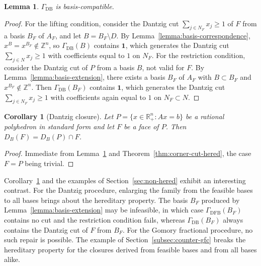 \documentclass{article}
\newtheorem{corollary}{Corollary}
\newtheorem{lemma}{Lemma}
\newcommand{\Z}{\mathbb{Z}}
\newcommand{\R}{\mathbb{R}}
\begin{document}
\begin{lemma} \label{lemma:dantzig-compatible}
    $\Gamma_{\mathrm{DB}}$ is basis-compatible.
\end{lemma}

\begin{proof}
    For the lifting condition, consider the Dantzig cut $\sum_{j \in N_F} x_j \geq 1$ of $F$ from a basis $B_F$ of $A_F$, and let $B = B_F \setminus D$. By Lemma~\ref{lemma:basis-correspondence}, $x^B = x^{B_F} \notin \Z^n$, so $\Gamma_{\mathrm{DB}}(B)$ contains $\mathbf{1}$, which generates the Dantzig cut $\sum_{j \in N} x_j \geq 1$ with coefficients equal to $1$ on $N_F$. For the restriction condition, consider the Dantzig cut of $P$ from a basis $B$, not valid for $F$. By Lemma~\ref{lemma:basis-extension}, there exists a basis $B_F$ of $A_F$ with $B \subset B_F$ and $x^{B_F} \notin \Z^n$. Then $\Gamma_{\mathrm{DB}}(B_F)$ contains $\mathbf{1}$, which generates the Dantzig cut $\sum_{j \in N_F} x_j \geq 1$ with coefficients again equal to $1$ on $N_F \subset N$.
\end{proof}

\begin{corollary}[Dantzig closure] \label{cor:dantzig-hered}
    Let $P = \{x \in \R_+^n : Ax = b\}$ be a rational polyhedron in standard form and let $F$ be a face of $P$. Then $D_{B}(F) = D_{B}(P) \cap F$.
\end{corollary}

\begin{proof}
    Immediate from Lemma~\ref{lemma:dantzig-compatible} and Theorem~\ref{thm:corner-cut-hered}, the case $F = P$ being trivial.
\end{proof}

Corollary~\ref{cor:dantzig-hered} and the examples of Section~\ref{sec:non-hered} exhibit an interesting contrast. For the Dantzig procedure, enlarging the family from the feasible bases to all bases brings about the hereditary property. The basis $B_F$ produced by Lemma~\ref{lemma:basis-extension} may be infeasible, in which case $\Gamma_{\mathrm{DFB}}(B_F)$ contains no cut and the restriction condition fails, whereas $\Gamma_{\mathrm{DB}}(B_F)$ always contains the Dantzig cut of $F$ from $B_F$. For the Gomory fractional procedure, no such repair is possible. The example of Section~\ref{subsec:counter-gfc} breaks the hereditary property for the closures derived from feasible bases and from all bases alike.

\end{document}
